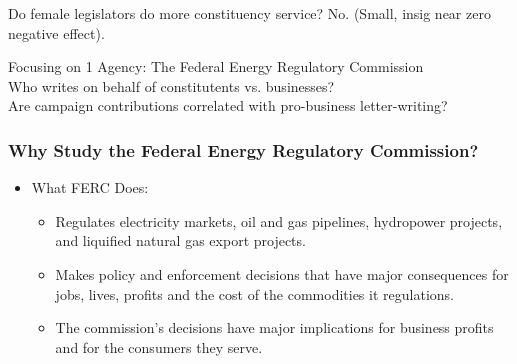 \documentclass[13pt]{beamer}
\begin{document}

\begin{frame}

\begin{center}
\Large
Do female legislators do more constituency service?  
\pause
No.  (Small, insig near zero negative effect).  
\end{center}
\end{frame}
\begin{frame}
\begin{center}
\Large

Focusing on 1 Agency: The Federal Energy Regulatory Commission \\ \pause 
\bigskip
Who writes on behalf of constitutents vs. businesses?  \\ \pause
\bigskip
Are campaign contributions correlated with pro-business letter-writing?
\end{center}
\end{frame}
\begin{frame} 
\frametitle{Why Study the Federal Energy Regulatory Commission?}
\Large
\begin{itemize}
\item What FERC Does:
\begin{itemize}
\item Regulates electricity markets, oil and gas pipelines, hydropower projects, and liquified natural gas export projects. 
\item Makes policy and enforcement decisions that have major consequences for jobs, lives, profits and the cost of the commodities it regulations. 
\item The commission's decisions have major implications for business profits and for the consumers they serve. 
\end{itemize}
\end{itemize}

\end{frame}
\end{document}
